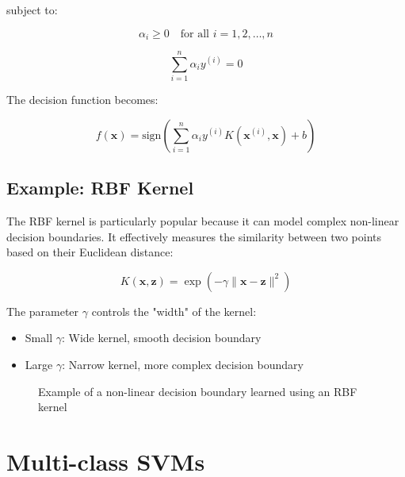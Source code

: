 \documentclass{article}
\begin{document}
subject to:

\[
\alpha_i \geq 0 \quad \text{for all } i = 1, 2, \ldots, n
\]

\[
\sum_{i=1}^{n} \alpha_i y^{(i)} = 0
\]

The decision function becomes:

\[
f(\mathbf{x}) = \text{sign}\left(\sum_{i=1}^{n} \alpha_i y^{(i)} K(\mathbf{x}^{(i)}, \mathbf{x}) + b\right)
\]

\subsection{Example: RBF Kernel}
The RBF kernel is particularly popular because it can model complex non-linear decision boundaries. It effectively measures the similarity between two points based on their Euclidean distance:

\[
K(\mathbf{x}, \mathbf{z}) = \exp(-\gamma \|\mathbf{x} - \mathbf{z}\|^2)
\]

The parameter $\gamma$ controls the "width" of the kernel:
\begin{itemize}
    \item Small $\gamma$: Wide kernel, smooth decision boundary
    \item Large $\gamma$: Narrow kernel, more complex decision boundary
\end{itemize}

\begin{figure}[h]
\centering
{}
\caption{Example of a non-linear decision boundary learned using an RBF kernel}
\end{figure}

\section{Multi-class SVMs}
\end{document}
